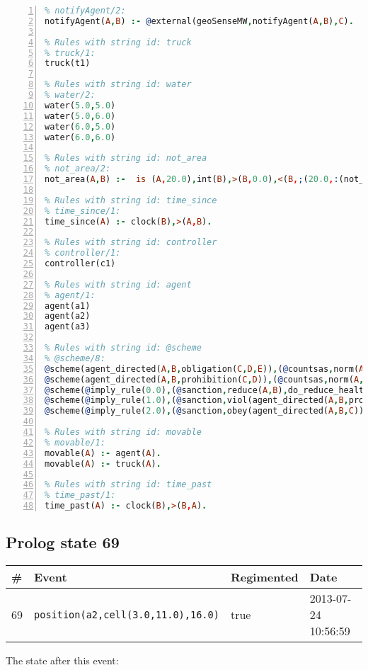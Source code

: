 \documentclass[11pt]{article}\usepackage[utf8]{inputenc}\usepackage{geometry}
\begin{document}
\begin{lstlisting}[language=Prolog, numbers=left]
% Rules with string id: notifyAgent
% notifyAgent/2:
notifyAgent(A,B) :- @external(geoSenseMW,notifyAgent(A,B),C).

% Rules with string id: truck
% truck/1:
truck(t1)

% Rules with string id: water
% water/2:
water(5.0,5.0)
water(5.0,6.0)
water(6.0,5.0)
water(6.0,6.0)

% Rules with string id: not_area
% not_area/2:
not_area(A,B) :-  is (A,20.0),int(B),>(B,0.0),<(B,;(20.0,:(not_area(A,B), is (-(B),20.0)))),int(A),>(A,0.0),<(A,;(20.0,:(area(A,B),-(int(A))))),int(B),>(A,0.0),>(B,0.0),<(A,21.0),<(B,21.0).

% Rules with string id: time_since
% time_since/1:
time_since(A) :- clock(B),>(A,B).

% Rules with string id: controller
% controller/1:
controller(c1)

% Rules with string id: agent
% agent/1:
agent(a1)
agent(a2)
agent(a3)

% Rules with string id: @scheme
% @scheme/8:
@scheme(agent_directed(A,B,obligation(C,D,E)),(@countsas,norm(A,B,F,obligation(C,D,E)),F),false,(listTrue(C)),(time_past(D)),false,[plus(viol(agent_directed(A,B,obligation(C,D,E))))|[]],[plus(obey(agent_directed(A,B,obligation(C,D,E))))|[]])
@scheme(agent_directed(A,B,prohibition(C,D)),(@countsas,norm(A,B,E,prohibition(C,D)),E),(listTrue(C)),false,(false),false,[plus(viol(agent_directed(A,B,prohibition(C,D))))|[]],[plus(obey(agent_directed(A,B,prohibition(C,D))))|[]])
@scheme(@imply_rule(0.0),(@sanction,reduce(A,B),do_reduce_health(A,B),notifyAgent(A,changed(status))),true,false,false,false,[min(reduce(A,B))|[]],[])
@scheme(@imply_rule(1.0),(@sanction,viol(agent_directed(A,B,prohibition(C,D))),do_sanction(D)),true,false,false,false,[min(viol(agent_directed(A,B,prohibition(C,D))))|[]],[])
@scheme(@imply_rule(2.0),(@sanction,obey(agent_directed(A,B,C))),true,false,false,false,[min(obey(agent_directed(A,B,C)))|[]],[])

% Rules with string id: movable
% movable/1:
movable(A) :- agent(A).
movable(A) :- truck(A).

% Rules with string id: time_past
% time_past/1:
time_past(A) :- clock(B),>(B,A).

\end{lstlisting}
\clearpage 
\subsection{Prolog state 69}
\begin{table}[ht]
\centering 
\begin{tabular}{l l l l} 
\textbf{\#} & \textbf{Event} & \textbf{Regimented} & \textbf{Date} \\ [0.5ex] 
\hline
69&\texttt{position(a2,cell(3.0,11.0),16.0)}&true&2013-07-24 10:56:59\\ [1ex] \hline\end{tabular}
\end{table}
The state after this event:
\end{document}
